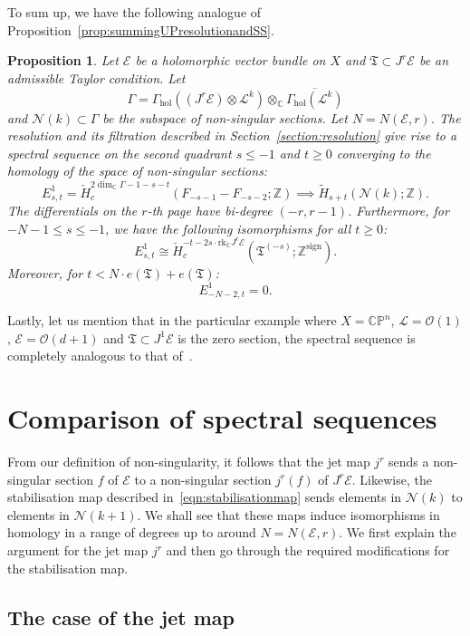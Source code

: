 \documentclass[a4paper]{amsart}
\newcommand{\bZ}{\mathbb Z}
\newcommand{\bC}{\mathbb C}
\newcommand{\bP}{\mathbb P}
\newcommand{\cE}{\mathcal E}
\newcommand{\cN}{\mathcal N}
\newcommand{\cL}{\mathcal L}
\newcommand{\cO}{\mathcal O}
\newcommand{\fT}{\mathfrak T}
\theoremstyle{plain}
\newtheorem{proposition}[theorem]{Proposition}
\theoremstyle{definition}
\newcommand{\CCH}{\check{H}_{c}}
\newcommand{\Gammahol}{\Gamma_{\mathrm{hol}}}
\newcommand{\rank}{\mathrm{rk}}
\begin{document}
\bigskip

To sum up, we have the following analogue of Proposition~\ref{prop:summingUPresolutionandSS}.
\begin{proposition}\label{prop:summingUPadapted}
Let $\cE$ be a holomorphic vector bundle on $X$ and $\fT \subset J^r\cE$ be an admissible Taylor condition. Let 
\[
    \Gamma = \Gammahol\left( (J^r\cE) \otimes \cL^k \right) \otimes_\bC \overline{\Gammahol\left(\cL^k \right)}
\]
and $\cN(k) \subset \Gamma$ be the subspace of non-singular sections. Let $N = N(\cE,r)$. The resolution and its filtration described in Section~\ref{section:resolution} give rise to a spectral sequence on the second quadrant $s \leq -1$ and $t \geq 0$ converging to the homology of the space of non-singular sections:
\[
    E^1_{s,t} = \CCH^{2\dim_\bC \Gamma - 1 - s - t}(F_{-s-1} - F_{-s-2}; \bZ) \implies \widetilde{H}_{s+t}(\cN(k); \bZ).
\]
The differentials on the $r$-th page have bi-degree $(-r,r-1)$. Furthermore, for $-N-1 \leq s \leq -1$, we have the following isomorphisms for all $t \geq 0$:
\[
    E^1_{s,t} \cong \CCH^{-t - 2s \cdot \rank_\bC J^r\cE}(\fT^{(-s)}; \bZ^\mathrm{sign}).
\]
Moreover, for $t < N\cdot e(\fT) + e(\fT)$:
\[
    E^1_{-N-2,t} = 0.
\]
\end{proposition}

Lastly, let us mention that in the particular example where $X = \bC\bP^n$, $\cL = \cO(1)$, $\cE = \cO(d+1)$ and $\fT \subset J^1\cE$ is the zero section, the spectral sequence is completely analogous to that of~\cite{mostovy_truncated_2012}.

\section{Comparison of spectral sequences}\label{section:compareSS}

From our definition of non-singularity, it follows that the jet map $j^r$ sends a non-singular section $f$ of $\cE$ to a non-singular section $j^r(f)$ of $J^r\cE$. Likewise, the stabilisation map described in~\eqref{eqn:stabilisationmap} sends elements in $\cN(k)$ to elements in $\cN(k+1)$. We shall see that these maps induce isomorphisms in homology in a range of degrees up to around $N = N(\cE,r)$. We first explain the argument for the jet map $j^r$ and then go through the required modifications for the stabilisation map.

\subsection{The case of the jet map}
\end{document}
